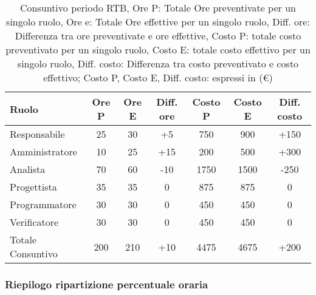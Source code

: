\begin{table}[H]
	\centering
	\begin{tabular}{l|c|c|c|c|c|c}
		\textbf{Ruolo}    & \textbf{Ore P} & \textbf{Ore E} & \textbf{Diff. ore} & \textbf{Costo P} & \textbf{Costo E} & \textbf{Diff. costo} \\
		\hline
		Responsabile      & 25             & 30             & +5                 & 750              & 900              & +150                 \\
		Amministratore    & 10             & 25             & +15                & 200              & 500              & +300                 \\
		Analista          & 70             & 60             & -10                & 1750             & 1500             & -250                 \\
		Progettista       & 35             & 35             & 0                  & 875              & 875              & 0                    \\
		Programmatore     & 30             & 30             & 0                  & 450              & 450              & 0                    \\
		Verificatore      & 30             & 30             & 0                  & 450              & 450              & 0                    \\
		\hline
		Totale Consuntivo & 200            & 210            & +10                & 4475             & 4675             & +200                 \\
		\hline
	\end{tabular}
	\caption{Consuntivo periodo RTB, Ore P: Totale Ore preventivate per un singolo ruolo, Ore e: Totale Ore effettive per un singolo ruolo,
		Diff. ore: Differenza tra ore preventivate e ore effettive, Costo P: totale costo preventivato per un singolo ruolo,
		Costo E: totale costo effettivo per un singolo ruolo,  Diff. costo: Differenza tra costo preventivato e costo effettivo;
		Costo P, Costo E, Diff. costo: espressi in (\euro)}
\end{table}






\subsubsection{Riepilogo ripartizione percentuale oraria}

